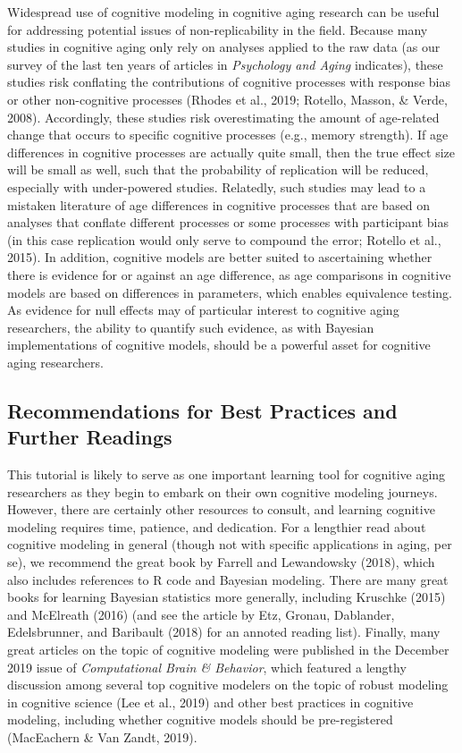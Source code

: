 \documentclass[
  english,
  ,man,floatsintext]{apa6}
\begin{document}
Widespread use of cognitive modeling in cognitive aging research can be useful for addressing potential issues of non-replicability in the field. Because many studies in cognitive aging only rely on analyses applied to the raw data (as our survey of the last ten years of articles in \emph{Psychology and Aging} indicates), these studies risk conflating the contributions of cognitive processes with response bias or other non-cognitive processes (Rhodes et al., 2019; Rotello, Masson, \& Verde, 2008). Accordingly, these studies risk overestimating the amount of age-related change that occurs to specific cognitive processes (e.g., memory strength). If age differences in cognitive processes are actually quite small, then the true effect size will be small as well, such that the probability of replication will be reduced, especially with under-powered studies. Relatedly, such studies may lead to a mistaken literature of age differences in cognitive processes that are based on analyses that conflate different processes or some processes with participant bias (in this case replication would only serve to compound the error; Rotello et al., 2015). In addition, cognitive models are better suited to ascertaining whether there is evidence for or against an age difference, as age comparisons in cognitive models are based on differences in parameters, which enables equivalence testing. As evidence for null effects may of particular interest to cognitive aging researchers, the ability to quantify such evidence, as with Bayesian implementations of cognitive models, should be a powerful asset for cognitive aging researchers.

\hypertarget{recommendations-for-best-practices-and-further-readings}{%
\subsection{Recommendations for Best Practices and Further Readings}\label{recommendations-for-best-practices-and-further-readings}}

This tutorial is likely to serve as one important learning tool for cognitive aging researchers as they begin to embark on their own cognitive modeling journeys. However, there are certainly other resources to consult, and learning cognitive modeling requires time, patience, and dedication. For a lengthier read about cognitive modeling in general (though not with specific applications in aging, per se), we recommend the great book by Farrell and Lewandowsky (2018), which also includes references to R code and Bayesian modeling. There are many great books for learning Bayesian statistics more generally, including Kruschke (2015) and McElreath (2016) (and see the article by Etz, Gronau, Dablander, Edelsbrunner, and Baribault (2018) for an annoted reading list). Finally, many great articles on the topic of cognitive modeling were published in the December 2019 issue of \emph{Computational Brain \& Behavior}, which featured a lengthy discussion among several top cognitive modelers on the topic of robust modeling in cognitive science (Lee et al., 2019) and other best practices in cognitive modeling, including whether cognitive models should be pre-registered (MacEachern \& Van Zandt, 2019).
\end{document}
